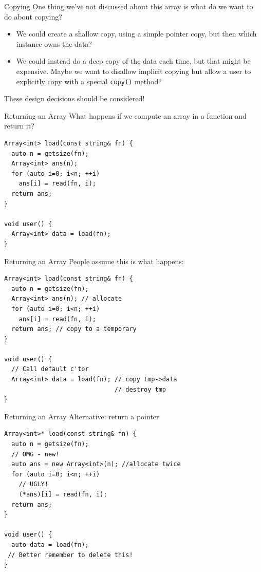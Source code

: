 \documentclass[presentation,t]{beamer}
\newcommand{\code}[1]{\lstinline!#1!}
\begin{document}
\begin{frame}{Copying}
  One thing we've not discussed about this array is what do we want to
  do about copying?
  \begin{itemize}
  \item We could create a shallow copy, using a simple pointer copy,
    but then which instance owns the data?

  \item We could instead do a deep copy of the data each time, but
    that might be expensive. Maybe we want to disallow implicit
    copying but allow a user to explicitly copy with a special
    \code{copy()} method?
  \end{itemize}
  These design decisions should be considered!
\end{frame}

\begin{frame}[fragile]{Returning an Array}
  What happens if we compute an array in a function and return it?
  
\begin{lstlisting}
Array<int> load(const string& fn) {
  auto n = getsize(fn);
  Array<int> ans(n);
  for (auto i=0; i<n; ++i)
    ans[i] = read(fn, i);
  return ans;
}

void user() {
  Array<int> data = load(fn);
}
\end{lstlisting}
\end{frame}

\begin{frame}[fragile]{Returning an Array}
  People assume this is what happens:
\begin{lstlisting}
Array<int> load(const string& fn) {
  auto n = getsize(fn);
  Array<int> ans(n); // allocate
  for (auto i=0; i<n; ++i)
    ans[i] = read(fn, i);
  return ans; // copy to a temporary
}

void user() {
  // Call default c'tor
  Array<int> data = load(fn); // copy tmp->data
                              // destroy tmp
}
\end{lstlisting}

\end{frame}

\begin{frame}[fragile]{Returning an Array}
  Alternative: return a pointer
\begin{lstlisting}
Array<int>* load(const string& fn) {
  auto n = getsize(fn);
  // OMG - new!
  auto ans = new Array<int>(n); //allocate twice
  for (auto i=0; i<n; ++i)
    // UGLY!
    (*ans)[i] = read(fn, i);
  return ans;
}

void user() {
  auto data = load(fn);
 // Better remember to delete this!
}
\end{lstlisting}
\end{frame}
\end{document}
